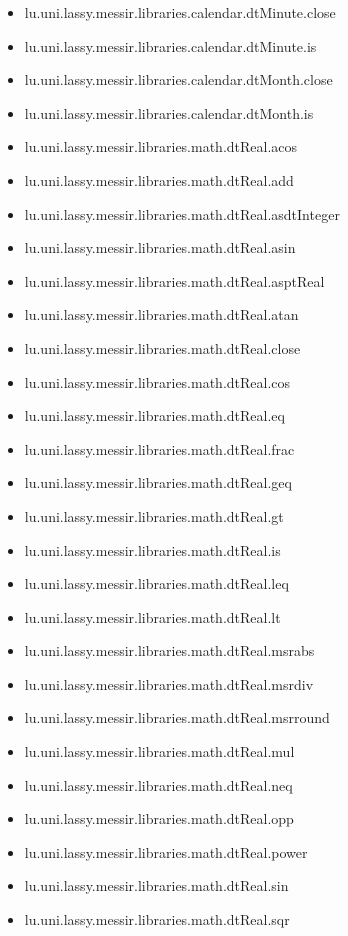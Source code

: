\begin{itemize}
\item lu.uni.lassy.messir.libraries.calendar.dtMinute.close 
\item lu.uni.lassy.messir.libraries.calendar.dtMinute.is 
\item lu.uni.lassy.messir.libraries.calendar.dtMonth.close 
\item lu.uni.lassy.messir.libraries.calendar.dtMonth.is 
\item lu.uni.lassy.messir.libraries.math.dtReal.acos 
\item lu.uni.lassy.messir.libraries.math.dtReal.add 
\item lu.uni.lassy.messir.libraries.math.dtReal.asdtInteger 
\item lu.uni.lassy.messir.libraries.math.dtReal.asin 
\item lu.uni.lassy.messir.libraries.math.dtReal.asptReal 
\item lu.uni.lassy.messir.libraries.math.dtReal.atan 
\item lu.uni.lassy.messir.libraries.math.dtReal.close 
\item lu.uni.lassy.messir.libraries.math.dtReal.cos 
\item lu.uni.lassy.messir.libraries.math.dtReal.eq 
\item lu.uni.lassy.messir.libraries.math.dtReal.frac 
\item lu.uni.lassy.messir.libraries.math.dtReal.geq 
\item lu.uni.lassy.messir.libraries.math.dtReal.gt 
\item lu.uni.lassy.messir.libraries.math.dtReal.is 
\item lu.uni.lassy.messir.libraries.math.dtReal.leq 
\item lu.uni.lassy.messir.libraries.math.dtReal.lt 
\item lu.uni.lassy.messir.libraries.math.dtReal.msrabs 
\item lu.uni.lassy.messir.libraries.math.dtReal.msrdiv 
\item lu.uni.lassy.messir.libraries.math.dtReal.msrround 
\item lu.uni.lassy.messir.libraries.math.dtReal.mul 
\item lu.uni.lassy.messir.libraries.math.dtReal.neq 
\item lu.uni.lassy.messir.libraries.math.dtReal.opp 
\item lu.uni.lassy.messir.libraries.math.dtReal.power 
\item lu.uni.lassy.messir.libraries.math.dtReal.sin 
\item lu.uni.lassy.messir.libraries.math.dtReal.sqr 

\end{itemize}
